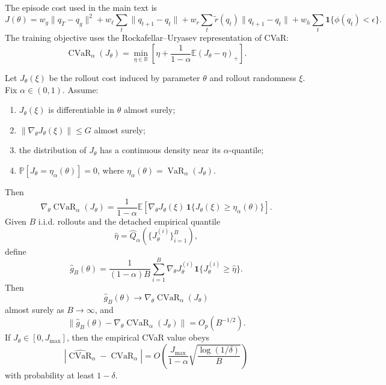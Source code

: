 The episode cost used in the main text is
\[
    J(\theta)
    =
    w_g\|q_T-q_g\|^2
    +
    w_\ell\sum_t\|q_{t+1}-q_t\|
    +
    w_r\sum_t \widetilde r(q_t)\|q_{t+1}-q_t\|
    +
    w_h\sum_t \mathbf 1\{\phi(q_t)<\epsilon\}.
\]
The training objective uses the Rockafellar--Uryasev representation of CVaR:
\[
    \operatorname{CVaR}_\alpha(J_\theta)
    =
    \min_{\eta\in\mathbb R}
    \left[
    \eta+
    \frac{1}{1-\alpha}\mathbb E(J_\theta-\eta)_+
    \right].
\]

\begin{theorem}
\label{thm:cvar_consistency}
Let \(J_\theta(\xi)\) be the rollout cost induced by parameter \(\theta\) and rollout
randomness \(\xi\). Fix \(\alpha\in(0,1)\). Assume:
\begin{enumerate}
    \item \(J_\theta(\xi)\) is differentiable in \(\theta\) almost surely;
    \item \(\|\nabla_\theta J_\theta(\xi)\|\le G\) almost surely;
    \item the distribution of \(J_\theta\) has a continuous density near its
    \(\alpha\)-quantile;
    \item \(\mathbb P[J_\theta=\eta_\alpha(\theta)]=0\), where
    \(\eta_\alpha(\theta)=\operatorname{VaR}_\alpha(J_\theta)\).
\end{enumerate}
Then
\[
    \nabla_\theta \operatorname{CVaR}_\alpha(J_\theta)
    =
    \frac{1}{1-\alpha}
    \mathbb E
    \left[
    \nabla_\theta J_\theta(\xi)\,
    \mathbf 1\{J_\theta(\xi)\ge \eta_\alpha(\theta)\}
    \right].
\]
Given \(B\) i.i.d. rollouts and the detached empirical quantile
\[
    \widehat \eta
    =
    \widehat Q_\alpha(\{J_\theta^{(i)}\}_{i=1}^B),
\]
define
\[
    \widehat g_B(\theta)
    =
    \frac{1}{(1-\alpha)B}
    \sum_{i=1}^B
    \nabla_\theta J_\theta^{(i)}
    \mathbf 1\{J_\theta^{(i)}\ge \widehat \eta\}.
\]
Then
\[
    \widehat g_B(\theta)
    \to
    \nabla_\theta \operatorname{CVaR}_\alpha(J_\theta)
\]
almost surely as \(B\to\infty\), and
\[
    \|\widehat g_B(\theta)
    -
    \nabla_\theta \operatorname{CVaR}_\alpha(J_\theta)\|
    =
    O_p(B^{-1/2}).
\]
If \(J_\theta\in[0,J_{\max}]\), then the empirical CVaR value obeys
\[
    |\widehat{\operatorname{CVaR}}_\alpha-\operatorname{CVaR}_\alpha|
    =
    O\!\left(
    \frac{J_{\max}}{1-\alpha}
    \sqrt{\frac{\log(1/\delta)}{B}}
    \right)
\]
with probability at least \(1-\delta\).
\end{theorem}


